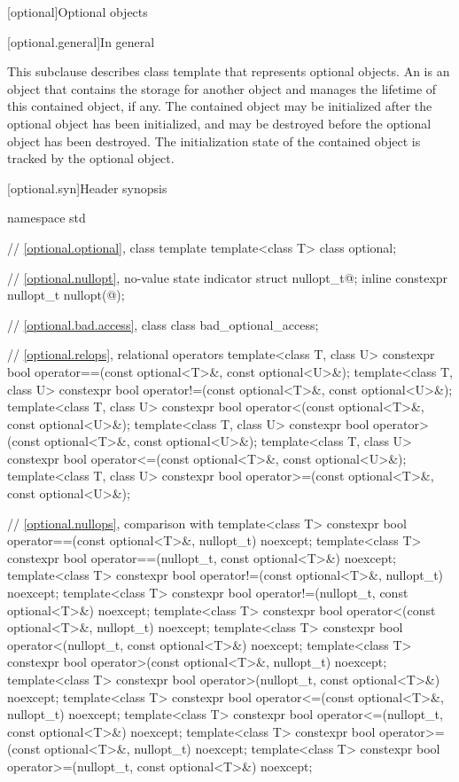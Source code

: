 [optional]{Optional objects}

[optional.general]{In general}

\pnum
This subclause describes class template  that represents
optional objects.
An  is an
object that contains the storage for another object and manages the lifetime of
this contained object, if any. The contained object may be initialized after
the optional object has been initialized, and may be destroyed before the
optional object has been destroyed. The initialization state of the contained
object is tracked by the optional object.

[optional.syn]{Header  synopsis}

%
\begin{codeblock}
namespace std {
  // \ref{optional.optional}, class template 
  template<class T>
    class optional;

  // \ref{optional.nullopt}, no-value state indicator
  struct nullopt_t{@\seebelow@};
  inline constexpr nullopt_t nullopt(@\unspec@);

  // \ref{optional.bad.access}, class 
  class bad_optional_access;

  // \ref{optional.relops}, relational operators
  template<class T, class U>
    constexpr bool operator==(const optional<T>&, const optional<U>&);
  template<class T, class U>
    constexpr bool operator!=(const optional<T>&, const optional<U>&);
  template<class T, class U>
    constexpr bool operator<(const optional<T>&, const optional<U>&);
  template<class T, class U>
    constexpr bool operator>(const optional<T>&, const optional<U>&);
  template<class T, class U>
    constexpr bool operator<=(const optional<T>&, const optional<U>&);
  template<class T, class U>
    constexpr bool operator>=(const optional<T>&, const optional<U>&);

  // \ref{optional.nullops}, comparison with 
  template<class T> constexpr bool operator==(const optional<T>&, nullopt_t) noexcept;
  template<class T> constexpr bool operator==(nullopt_t, const optional<T>&) noexcept;
  template<class T> constexpr bool operator!=(const optional<T>&, nullopt_t) noexcept;
  template<class T> constexpr bool operator!=(nullopt_t, const optional<T>&) noexcept;
  template<class T> constexpr bool operator<(const optional<T>&, nullopt_t) noexcept;
  template<class T> constexpr bool operator<(nullopt_t, const optional<T>&) noexcept;
  template<class T> constexpr bool operator>(const optional<T>&, nullopt_t) noexcept;
  template<class T> constexpr bool operator>(nullopt_t, const optional<T>&) noexcept;
  template<class T> constexpr bool operator<=(const optional<T>&, nullopt_t) noexcept;
  template<class T> constexpr bool operator<=(nullopt_t, const optional<T>&) noexcept;
  template<class T> constexpr bool operator>=(const optional<T>&, nullopt_t) noexcept;
  template<class T> constexpr bool operator>=(nullopt_t, const optional<T>&) noexcept;

}
\end{codeblock}
